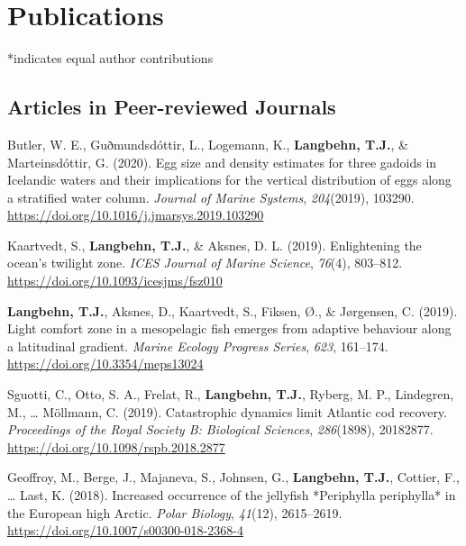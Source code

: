 \documentclass[11pt, a4paper]{awesome-cv}
\begin{document}
\hypertarget{publications}{%
\section{Publications}\label{publications}}

*indicates equal author contributions

\hypertarget{articles-in-peer-reviewed-journals}{%
\subsection{Articles in Peer-reviewed
Journals}\label{articles-in-peer-reviewed-journals}}

\begingroup
\setlength{\parindent}{-0.5in}
\setlength{\leftskip}{0.5in}

\hypertarget{refs_journals}{}
\leavevmode\hypertarget{ref-Butler2020}{}%
Butler, W. E., Guðmundsdóttir, L., Logemann, K.,
\textbf{Langbehn, T.J.}, \& Marteinsdóttir, G. (2020). Egg size and
density estimates for three gadoids in Icelandic waters and their
implications for the vertical distribution of eggs along a stratified
water column. \emph{Journal of Marine Systems}, \emph{204}(2019),
103290. \url{https://doi.org/10.1016/j.jmarsys.2019.103290}

\leavevmode\hypertarget{ref-Kaartvedt2019b}{}%
Kaartvedt, S., \textbf{Langbehn, T.J.}, \& Aksnes, D. L. (2019).
Enlightening the ocean's twilight zone. \emph{ICES Journal of Marine
Science}, \emph{76}(4), 803--812.
\url{https://doi.org/10.1093/icesjms/fsz010}

\leavevmode\hypertarget{ref-Langbehn2019a}{}%
\textbf{Langbehn, T.J.}, Aksnes, D., Kaartvedt, S., Fiksen, Ø., \&
Jørgensen, C. (2019). Light comfort zone in a mesopelagic fish emerges
from adaptive behaviour along a latitudinal gradient. \emph{Marine
Ecology Progress Series}, \emph{623}, 161--174.
\url{https://doi.org/10.3354/meps13024}

\leavevmode\hypertarget{ref-Sguotti}{}%
Sguotti, C., Otto, S. A., Frelat, R., \textbf{Langbehn, T.J.}, Ryberg,
M. P., Lindegren, M., \ldots{} Möllmann, C. (2019). Catastrophic
dynamics limit Atlantic cod recovery. \emph{Proceedings of the Royal
Society B: Biological Sciences}, \emph{286}(1898), 20182877.
\url{https://doi.org/10.1098/rspb.2018.2877}

\leavevmode\hypertarget{ref-Geoffroy2018}{}%
Geoffroy, M., Berge, J., Majaneva, S., Johnsen, G.,
\textbf{Langbehn, T.J.}, Cottier, F., \ldots{} Last, K. (2018).
Increased occurrence of the jellyfish *Periphylla periphylla* in the
European high Arctic. \emph{Polar Biology}, \emph{41}(12), 2615--2619.
\url{https://doi.org/10.1007/s00300-018-2368-4}
\end{document}
